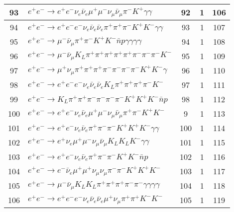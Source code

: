\documentclass[landscape]{article}
\begin{document}
\begin{table}[htbp!]
\begin{tabular}{|c|>{\centering}p{18cm}|c|c|c|}
\hline
93 & $ e^{+} e^{-} \rightarrow e^{+} e^{-} \nu_{e} \bar{\nu}_{e} \mu^{+} \mu^{-} \nu_{\mu} \bar{\nu}_{\mu} \pi^{-} K^{+} \gamma \gamma $ & 92 & 1 & 106 \\
\hline
94 & $ e^{+} e^{-} \rightarrow e^{+} e^{-} e^{-} \nu_{e} \bar{\nu}_{e} \bar{\nu}_{e} \pi^{+} \pi^{+} \pi^{-} K^{+} K^{-} \gamma \gamma $ & 93 & 1 & 107 \\
\hline
95 & $ e^{+} e^{-} \rightarrow \mu^{-} \bar{\nu}_{\mu} \pi^{+} \pi^{-} K^{+} K^{-} \bar{n} p \gamma \gamma \gamma \gamma $ & 94 & 1 & 108 \\
\hline
96 & $ e^{+} e^{-} \rightarrow \mu^{-} \bar{\nu}_{\mu} K_{L} \pi^{+} \pi^{+} \pi^{+} \pi^{+} \pi^{+} \pi^{-} \pi^{-} \pi^{-} K^{-} $ & 95 & 1 & 109 \\
\hline
97 & $ e^{+} e^{-} \rightarrow \mu^{+} \nu_{\mu} \pi^{+} \pi^{+} \pi^{+} \pi^{-} \pi^{-} \pi^{-} \pi^{-} K^{+} K^{-} \gamma $ & 96 & 1 & 110 \\
\hline
98 & $ e^{+} e^{-} \rightarrow e^{+} e^{-} e^{-} \nu_{e} \bar{\nu}_{e} \bar{\nu}_{e} K_{L} \pi^{+} \pi^{+} \pi^{+} \pi^{-} K^{-} $ & 97 & 1 & 111 \\
\hline
99 & $ e^{+} e^{-} \rightarrow K_{L} \pi^{+} \pi^{+} \pi^{-} \pi^{-} \pi^{-} \pi^{-} K^{+} K^{+} K^{-} \bar{n} p $ & 98 & 1 & 112 \\
\hline
100 & $ e^{+} e^{-} \rightarrow e^{+} e^{-} \nu_{e} \bar{\nu}_{e} \mu^{+} \mu^{-} \nu_{\mu} \bar{\nu}_{\mu} \pi^{+} \pi^{-} K^{+} K^{-} $ & 9 & 1 & 113 \\
\hline
101 & $ e^{+} e^{-} \rightarrow e^{+} e^{-} \nu_{e} \bar{\nu}_{e} \pi^{+} \pi^{-} \pi^{-} K^{+} K^{+} K^{-} \gamma \gamma $ & 100 & 1 & 114 \\
\hline
102 & $ e^{+} e^{-} \rightarrow e^{+} \nu_{e} \mu^{+} \mu^{-} \nu_{\mu} \bar{\nu}_{\mu} K_{L} K_{L} K^{-} \gamma \gamma $ & 101 & 1 & 115 \\
\hline
103 & $ e^{+} e^{-} \rightarrow e^{+} e^{-} \nu_{e} \bar{\nu}_{e} \pi^{+} \pi^{-} \pi^{-} K^{+} K^{-} \bar{n} p $ & 102 & 1 & 116 \\
\hline
104 & $ e^{+} e^{-} \rightarrow e^{-} \bar{\nu}_{e} \mu^{+} \mu^{+} \nu_{\mu} \nu_{\mu} \pi^{-} \pi^{-} K^{+} K^{+} K^{-} $ & 103 & 1 & 117 \\
\hline
105 & $ e^{+} e^{-} \rightarrow \mu^{-} \bar{\nu}_{\mu} K_{L} K_{L} \pi^{+} \pi^{+} \pi^{+} \pi^{-} \pi^{-} \gamma \gamma \gamma \gamma $ & 104 & 1 & 118 \\
\hline
106 & $ e^{+} e^{-} \rightarrow e^{+} e^{-} e^{-} \nu_{e} \bar{\nu}_{e} \bar{\nu}_{e} \mu^{+} \nu_{\mu} \pi^{+} \pi^{+} K^{-} K^{-} $ & 105 & 1 & 119 \\

\end{tabular}
\end{table}
\end{document}
